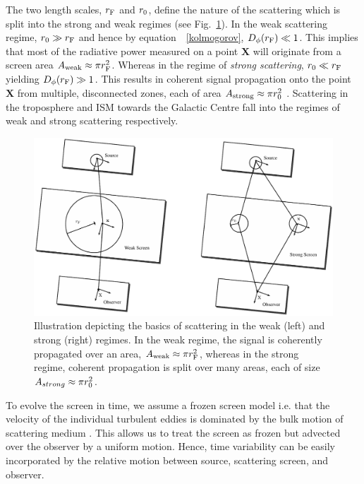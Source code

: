 The two length scales, $r_{\rm F}$ and $r_{\rm 0}$, define the nature of the scattering which is split into the strong and weak regimes (see Fig.~\ref{fig:scatter}). In the weak scattering regime, $ r_{\rm 0} \gg r_{\rm F}$ and hence by equation\ ~\ref{kolmogorov}, $D_{\phi}(r_{\rm F}) \ll 1$. This implies that most of the radiative power measured on a point $\bm{X}$ will originate from a screen area $A_{\rm weak} \approx \pi r_{\rm F}^2$. Whereas in the regime of \emph{strong scattering}, $ r_{\rm 0} \ll r_{\rm F}$ yielding  $D_{\phi}(r_{\rm F}) \gg 1$. This  results in coherent signal propagation onto the point $\bm{X}$ from multiple, disconnected zones, each of area $A_{\rm strong} \approx \pi r_{\rm 0}^2$ \citep{Narayan_1992}. Scattering in the troposphere and ISM towards the Galactic Centre fall into the regimes of weak and strong scattering respectively.

\begin{figure}
\begin{center}
\includegraphics[width=1.\columnwidth]{Images/scatter.pdf}
\caption{Illustration depicting the basics of scattering in the weak (left) and strong (right) regimes. In the weak regime, the signal is coherently propagated over an area, $A_{\rm weak} \approx \pi r_{\rm F}^2$, whereas in the strong regime, coherent propagation is split over many areas, each of size $A_{strong} \approx \pi r_{\rm 0}^2$. \label{fig:scatter}
}
\end{center}
\end{figure}

To evolve the screen in time, we assume a frozen screen model i.e. that the velocity of the individual turbulent eddies is dominated by the bulk motion of scattering medium \citep[e.g.][]{Lay_1997}. This allows us to treat the screen as frozen but advected over the observer by a uniform motion. Hence, time variability can be easily incorporated by the relative motion between source, scattering screen, and observer.

